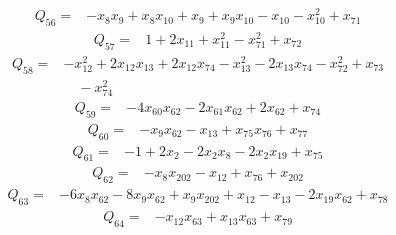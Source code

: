 \begin{equation*}\begin{split}
Q_{56}={}&-x_{8} x_{9} + x_{8} x_{10} + x_{9} + x_{9} x_{10} - x_{10} - x_{10}^{2} + x_{71}
\end{split}\end{equation*}
\begin{equation*}\begin{split}
Q_{57}={}&1 + 2x_{11} + x_{11}^{2} - x_{71}^{2} + x_{72}
\end{split}\end{equation*}
\begin{equation*}\begin{split}
Q_{58}={}&-x_{12}^{2} + 2x_{12} x_{13} + 2x_{12} x_{74} - x_{13}^{2} - 2x_{13} x_{74} - x_{72}^{2} + x_{73}\\
&\quad -x_{74}^{2}
\end{split}\end{equation*}
\begin{equation*}\begin{split}
Q_{59}={}&-4x_{60} x_{62} - 2x_{61} x_{62} + 2x_{62} + x_{74}
\end{split}\end{equation*}
\begin{equation*}\begin{split}
Q_{60}={}&-x_{9} x_{62} - x_{13} + x_{75} x_{76} + x_{77}
\end{split}\end{equation*}
\begin{equation*}\begin{split}
Q_{61}={}&-1 + 2x_{2} - 2x_{2} x_{8} - 2x_{2} x_{19} + x_{75}
\end{split}\end{equation*}
\begin{equation*}\begin{split}
Q_{62}={}&-x_{8} x_{202} - x_{12} + x_{76} + x_{202}
\end{split}\end{equation*}
\begin{equation*}\begin{split}
Q_{63}={}&-6x_{8} x_{62} - 8x_{9} x_{62} + x_{9} x_{202} + x_{12} - x_{13} - 2x_{19} x_{62} + x_{78}
\end{split}\end{equation*}
\begin{equation*}\begin{split}
Q_{64}={}&-x_{12} x_{63} + x_{13} x_{63} + x_{79}
\end{split}\end{equation*}
